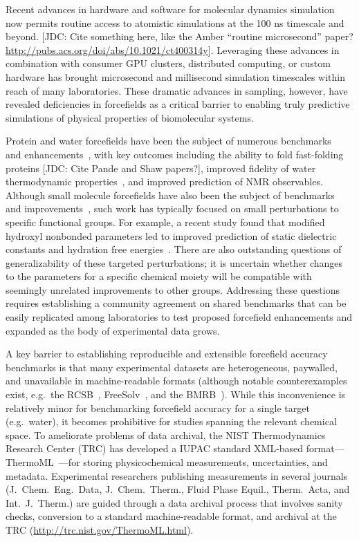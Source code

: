 \documentclass[aps,pre,twocolumn,nofootinbib,superscriptaddress,linenumbers]{revtex4-1}
\begin{document}
Recent advances in hardware and software for molecular dynamics simulation now permits routine access to atomistic simulations at the 100 ns timescale and beyond.
 {\color{red}[JDC: Cite something here, like the Amber ``routine microsecond'' paper? \url{http://pubs.acs.org/doi/abs/10.1021/ct400314y}]}. 
Leveraging these advances in combination with consumer GPU clusters, distributed computing, or custom hardware has brought microsecond and millisecond simulation timescales within reach of many laboratories.  
These dramatic advances in sampling, however, have revealed deficiencies in forcefields as a critical barrier to enabling truly predictive simulations of physical properties of biomolecular systems.  

Protein and water forcefields have been the subject of numerous benchmarks~\cite{lindorff2012systematic} and enhancements~\cite{li2011iterative, best2012optimization, Lindorff-Larsen2010}, with key outcomes including the ability to fold fast-folding proteins {\color{red}[JDC: Cite Pande and Shaw papers?]}, improved fidelity of water thermodynamic properties~\cite{horn2004}, and improved prediction of NMR observables.  
Although small molecule forcefields have also been the subject of benchmarks~\cite{caleman2011force} and improvements~\cite{fennell2014fixed}, such work has typically focused on small perturbations to specific functional groups.  
For example, a recent study found that modified hydroxyl nonbonded parameters led to improved prediction of static dielectric constants and hydration free energies~\cite{fennell2014fixed}.
There are also outstanding questions of generalizability of these targeted perturbations; it is uncertain whether changes to the parameters for a specific chemical moiety will be compatible with seemingly unrelated improvements to other groups.
Addressing these questions requires establishing a community agreement on shared benchmarks that can be easily replicated among laboratories to test proposed forcefield enhancements and expanded as the body of experimental data grows.

A key barrier to establishing reproducible and extensible forcefield accuracy benchmarks is that many experimental datasets are heterogeneous, paywalled, and unavailable in machine-readable formats (although notable counterexamples exist, e.g.~the RCSB~\cite{Berman2000}, FreeSolv~\cite{freesolv}, and the BMRB~\cite{Ulrich2008}).  
While this inconvenience is relatively minor for benchmarking forcefield accuracy for a single target (e.g.~water), it becomes prohibitive for studies spanning the relevant chemical space.  
To ameliorate problems of data archival, the NIST Thermodynamics Research Center (TRC) has developed a IUPAC standard XML-based format---ThermoML~\cite{frenkel2006xml}---for storing physicochemical measurements, uncertainties, and metadata.
Experimental researchers publishing measurements in several journals (J.~Chem.~Eng.~Data, J.~Chem.~Therm., Fluid Phase Equil., Therm.~Acta, and Int.~J.~Therm.) are guided through a data archival process that involves sanity checks, conversion to a standard machine-readable format, and archival at the TRC (\url{http://trc.nist.gov/ThermoML.html}).  
\end{document}
